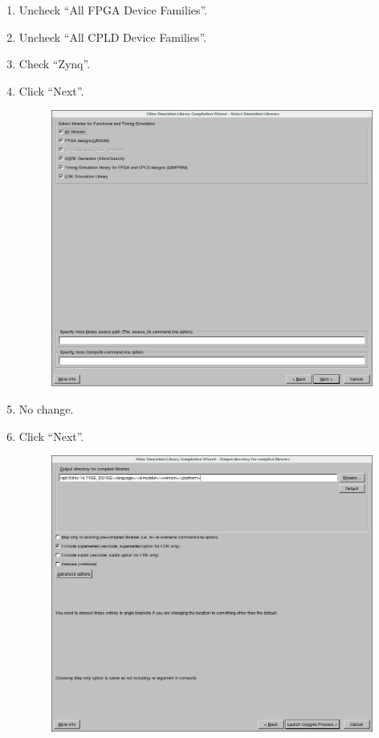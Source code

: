 \begin{flushleft}
\begin{enumerate}
		\item Uncheck ``All FPGA Device Families''.
		\item Uncheck ``All CPLD Device Families''.
		\item Check ``Zynq''.
		\item Click ``Next''.

	\begin{figure}[H]
	\centering\captionsetup{type=figure}\includegraphics[scale=0.5]{Xilinx_CompXLib_4_BuildAll}
		\label{fig:wizard_page_4}
	\end{figure}

		\item No change.
		\item Click ``Next''.

	\begin{figure}[H]
	\centering\captionsetup{type=figure}\includegraphics[scale=0.5]{Xilinx_CompXLib_5_SelectDefaults}
		\label{fig:wizard_page_5}
	\end{figure}


\end{enumerate}
\end{flushleft}
